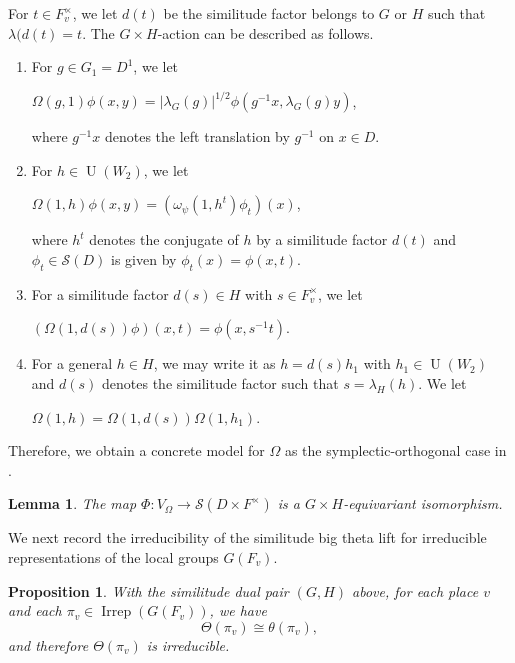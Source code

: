 \documentclass[11pt]{article}
\theoremstyle{plain}
\newtheorem{proposition}[theorem]{Proposition}
\newtheorem{lemma}[theorem]{Lemma}
\theoremstyle{remark}
\theoremstyle{definition}
\DeclareMathOperator{\U}{U}
\DeclareMathOperator{\irr}{Irrep}
\begin{document}
For $t\in F_{v}^{\times}$, we let $d(t)$ be the similitude factor belongs to $G$ or $H$ such that $\lambda(d(t)=t$. 
The $G\times H$-action can be described as follows.
\begin{enumerate}
\item For $g\in G_1=D^{1}$, we let
\begin{center}
    $\Omega(g,1)\phi(x,y)=|\lambda_{G}(g)|^{1/2}\phi(g^{-1}x,\lambda_{G}(g)y)$,
\end{center}
where $g^{-1}x$ denotes the left translation by $g^{-1}$ on $x\in D$. 
\item For $h\in \U(W_2)$, we let
\begin{center}
    $\Omega(1,h)\phi(x,y)=(\omega_{\psi}(1,h^t)\phi_{t})(x)$,
\end{center}
where $h^t$ denotes the conjugate of $h$ by a similitude factor $d(t)$ and $\phi_{t}\in \mathcal{S}(D)$ is given by $\phi_{t}(x)=\phi(x,t)$. 
\item For a similitude factor $d(s)\in H$ with $s\in F_{v}^{\times}$, we let
\begin{center}
    $(\Omega(1,d(s))\phi)(x,t)=\phi(x,s^{-1}t)$. 
\end{center}
\item For a general $h\in H$, we may write it as $h=d(s)h_1$ with $h_1\in \U(W_2)$ and $d(s)$ denotes the similitude factor such that $s=\lambda_{H}(h)$. 
We let
\begin{center}
 $\Omega(1,h)=\Omega(1,d(s))\Omega(1,h_1)$.
\end{center}
\end{enumerate}
Therefore, we obtain a concrete model for $\Omega$ as the symplectic-orthogonal case in \cite[Section 3]{RobertBrooks1996}. 

\begin{lemma}\label{lOmegaS}
The map $\Phi\colon V_{\Omega}\to \mathcal{S}(D\times F^{\times})$ is a $G\times H$-equivariant isomorphism.
\end{lemma}

We next record the irreducibility of the similitude big theta lift for irreducible representations of the local groups $G(F_v)$.

\begin{proposition}\label{psimstb}
With the similitude dual pair $(G,H)$ above, for each place $v$ and each $\pi_v\in \irr(G(F_v))$, we have
\[
\Theta(\pi_v)\cong\theta(\pi_v),
\]
and therefore $\Theta(\pi_v)$ is irreducible.
\end{proposition}
\end{document}

